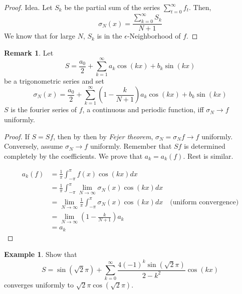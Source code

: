 \documentclass[12pt]{amsart}
\theoremstyle{definition}
\newtheorem{example}[theorem]{Example}
\newtheorem{remark}[theorem]{Remark}
\begin{document}
\begin{proof}{Idea.} Let $S_k$ be the partial sum of the series  $\sum_{t = 0}^{\infty}f_t$. Then,
\[
\sigma_N(x) = \frac{\sum_{k = 0}^{\infty}S_k}{N+1}
\]
We know that for large $N$, $S_k$ is in the $\epsilon$-Neighborhood of \(f\).
\end{proof}


\begin{remark}
    Let
    \[
    S = \frac{a_0}{2} +\sum_{k=1}^{\infty}a_k\cos(kx) + b_k\sin(kx)
    \]
    be a trigonometric series and set
    \[
    \sigma_N(x) = \frac{a_0}{2} +\sum_{k=1}^{\infty}(1 - \frac{k}{N+1})a_k\cos(kx) + b_k\sin(kx)
    \]
    $S$ is the fourier series of $f$, a continuous and periodic function, iff $\sigma_N \to f$ uniformly.
\end{remark}


\begin{proof}
    If $ S = Sf$, then by then by \textit{Fejer theorem}, $\sigma_N = \sigma_Nf \to f$ uniformly.
    Conversely, assume $\sigma_N \to f$ uniformly. Remember that $Sf$ is determined completely by the coefficients. We prove that $a_k = a_k(f)$. Rest is similar.

    \begin{align*}
        a_k(f) &= \frac{1}{\pi} \int_{-\pi}^{\pi} f(x) \cos(kx) dx\\
        &= \frac{1}{\pi} \int_{-\pi}^{\pi} \lim_{N \to \infty}\sigma_N(x) \cos(kx) dx\\
        &= \lim_{N \to \infty} \frac{1}{\pi} \int_{-\pi}^{\pi} \sigma_N(x) \cos(kx) dx \quad \text{(uniform convergence)}\\
        &= \lim_{N \to \infty} (1 - \frac{k}{N+1})a_k \\
        &= a_k
    \end{align*}
\end{proof}


\begin{example}
    Show that
    \[
    S = \sin(\sqrt{2}\pi) + \sum_{k=0}^{\infty}\frac{4(-1)^k\sin(\sqrt{2}\pi)}{2-k^2}\cos(kx)
    \]
    converges uniformly to $\sqrt{2}\pi\cos(\sqrt{2}\pi)$.
\end{example}
\end{document}

